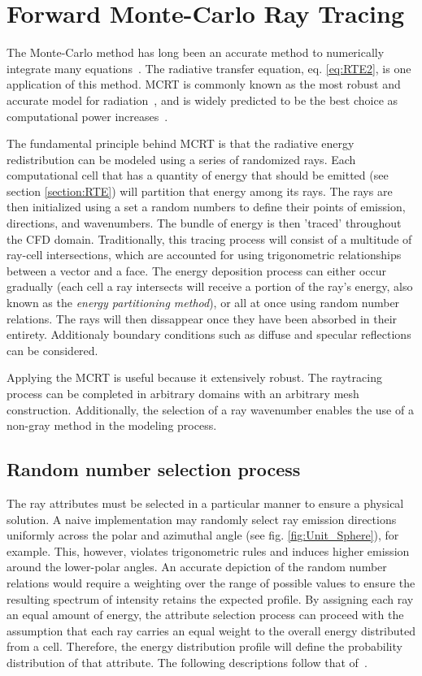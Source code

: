 \section{Forward Monte-Carlo Ray Tracing}
The Monte-Carlo method has long been an accurate method to numerically integrate many equations~\cite{Howell2021TheTransfer}. 
The radiative transfer equation, eq. \ref{eq:RTE2}, is one application of this method. 
MCRT is commonly known as the most robust and accurate model for radiation~\cite{Tesse2002RadiativeApproach}, and is widely predicted to be the best choice as computational power increases~\cite{Liu2020TheFlames,Howell2021TheTransfer}.

The fundamental principle behind MCRT is that the radiative energy redistribution can be modeled using a series of randomized rays. 
Each computational cell that has a quantity of energy that should be emitted (see section \ref{section:RTE}) will partition that energy among its rays. The rays are then initialized using a set a random numbers to define their points of emission, directions, and wavenumbers.
The bundle of energy is then 'traced' throughout the CFD domain. Traditionally, this tracing process will consist of a multitude of ray-cell intersections, which are accounted for using trigonometric relationships between a vector and a face.
The energy deposition process can either occur gradually (each cell a ray intersects will receive a portion of the ray's energy, also known as the \textit{energy partitioning method}), or all at once using random number relations.
The rays will then dissappear once they have been absorbed in their entirety. Additionaly boundary conditions such as diffuse and specular reflections can be considered.

Applying the MCRT is useful because it extensively robust. The raytracing process can be completed in arbitrary domains with an arbitrary mesh construction. Additionally, the selection of a ray wavenumber enables the use of a non-gray method in the modeling process.

\subsection{Random number selection process}  \label{section:randomnumberrelations}
The ray attributes must be selected in a particular manner to ensure a physical solution. A naive implementation may randomly select ray emission directions uniformly across the polar and azimuthal angle (see fig. \ref{fig:Unit_Sphere}), for example. This, however, violates trigonometric rules and induces higher emission around the lower-polar angles. 
An accurate depiction of the random number relations would require a weighting over the range of possible values to ensure the resulting spectrum of intensity retains the expected profile. 
By assigning each ray an equal amount of energy, the attribute selection process can proceed with the assumption that each ray carries an equal weight to the overall energy distributed from a cell.
Therefore, the energy distribution profile will define the probability distribution of that attribute.
The following descriptions follow that of~\citet{Modest2013RadiativeTransfer}.

